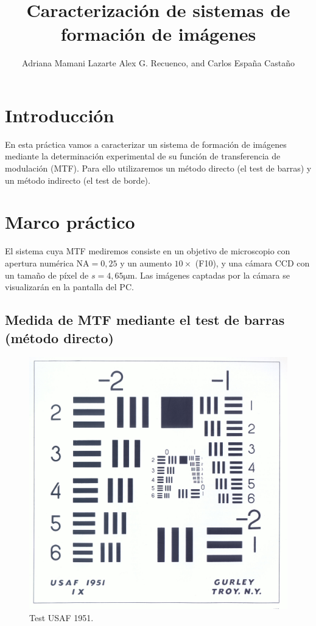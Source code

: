 \documentclass{./packages/optica-article}
\begin{document}
\title{Caracterización de sistemas de formación de imágenes}

\author{Adriana Mamani Lazarte Alex G. Recuenco, and Carlos España Castaño}

\address{Universidad Complutense de Madrid, Madrid, CP 28040, España}

\section{Introducción}
En esta práctica vamos a caracterizar un sistema de formación de imágenes mediante la determinación experimental de su función de transferencia de modulación (MTF). Para ello utilizaremos un método directo (el test de barras) y un método indirecto (el test de borde).


\section{Marco práctico}
El sistema cuya MTF mediremos consiste en un objetivo de microscopio con apertura numérica $\textrm{NA} = 0,25$ y un aumento $10\times$ (F10),
y una cámara CCD con un tamaño de píxel de $s=4,65 \unit{\micro\meter}$.
Las imágenes captadas por la cámara se visualizarán en la pantalla del PC.

\subsection{Medida de MTF mediante el test de barras (método directo)}\label{sec:directo}

\begin{figure}[h]
	\centering
	\includegraphics[scale=0.05]{testusaf1951}
	\caption{Test USAF 1951.}\label{fig:usaf1951}
\end{figure}
\end{document}
